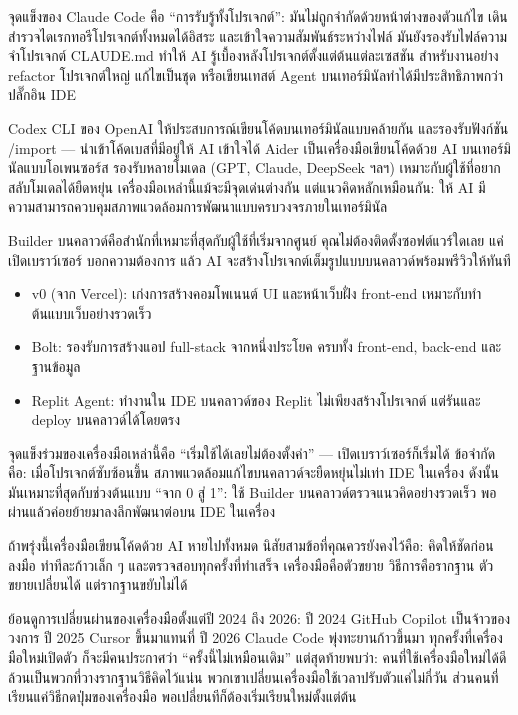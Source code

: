 จุดแข็งของ Claude Code คือ “การรับรู้ทั้งโปรเจกต์”: มันไม่ถูกจำกัดด้วยหน้าต่างของตัวแก้ไข เดินสำรวจไดเรกทอรีโปรเจกต์ทั้งหมดได้อิสระ และเข้าใจความสัมพันธ์ระหว่างไฟล์ มันยังรองรับไฟล์ความจำโปรเจกต์ CLAUDE.md ทำให้ AI รู้เบื้องหลังโปรเจกต์ตั้งแต่ต้นแต่ละเซสชัน สำหรับงานอย่าง refactor โปรเจกต์ใหญ่ แก้ไขเป็นชุด หรือเขียนเทสต์ Agent บนเทอร์มินัลทำได้มีประสิทธิภาพกว่าปลั๊กอิน IDE


Codex CLI ของ OpenAI ให้ประสบการณ์เขียนโค้ดบนเทอร์มินัลแบบคล้ายกัน และรองรับฟังก์ชัน /import — นำเข้าโค้ดเบสที่มีอยู่ให้ AI เข้าใจได้ Aider เป็นเครื่องมือเขียนโค้ดด้วย AI บนเทอร์มินัลแบบโอเพนซอร์ส รองรับหลายโมเดล (GPT, Claude, DeepSeek ฯลฯ) เหมาะกับผู้ใช้ที่อยากสลับโมเดลได้ยืดหยุ่น เครื่องมือเหล่านี้แม้จะมีจุดเด่นต่างกัน แต่แนวคิดหลักเหมือนกัน: ให้ AI มีความสามารถควบคุมสภาพแวดล้อมการพัฒนาแบบครบวงจรภายในเทอร์มินัล


Builder บนคลาวด์คือสำนักที่เหมาะที่สุดกับผู้ใช้ที่เริ่มจากศูนย์ คุณไม่ต้องติดตั้งซอฟต์แวร์ใดเลย แค่เปิดเบราว์เซอร์ บอกความต้องการ แล้ว AI จะสร้างโปรเจกต์เต็มรูปแบบบนคลาวด์พร้อมพรีวิวให้ทันที

\begin{itemize}
  \item v0 (จาก Vercel): เก่งการสร้างคอมโพเนนต์ UI และหน้าเว็บฝั่ง front-end เหมาะกับทำต้นแบบเว็บอย่างรวดเร็ว
  \item Bolt: รองรับการสร้างแอป full-stack จากหนึ่งประโยค ครบทั้ง front-end, back-end และฐานข้อมูล
  \item Replit Agent: ทำงานใน IDE บนคลาวด์ของ Replit ไม่เพียงสร้างโปรเจกต์ แต่รันและ deploy บนคลาวด์ได้โดยตรง
\end{itemize}

จุดแข็งร่วมของเครื่องมือเหล่านี้คือ “เริ่มใช้ได้เลยไม่ต้องตั้งค่า” — เปิดเบราว์เซอร์ก็เริ่มได้ ข้อจำกัดคือ: เมื่อโปรเจกต์ซับซ้อนขึ้น สภาพแวดล้อมแก้ไขบนคลาวด์จะยืดหยุ่นไม่เท่า IDE ในเครื่อง ดังนั้นมันเหมาะที่สุดกับช่วงต้นแบบ “จาก 0 สู่ 1”: ใช้ Builder บนคลาวด์ตรวจแนวคิดอย่างรวดเร็ว พอผ่านแล้วค่อยย้ายมาลงลึกพัฒนาต่อบน IDE ในเครื่อง


ถ้าพรุ่งนี้เครื่องมือเขียนโค้ดด้วย AI หายไปทั้งหมด นิสัยสามข้อที่คุณควรยังคงไว้คือ: คิดให้ชัดก่อนลงมือ ทำทีละก้าวเล็ก ๆ และตรวจสอบทุกครั้งที่ทำเสร็จ เครื่องมือคือตัวขยาย วิธีการคือรากฐาน ตัวขยายเปลี่ยนได้ แต่รากฐานขยับไม่ได้

ย้อนดูการเปลี่ยนผ่านของเครื่องมือตั้งแต่ปี 2024 ถึง 2026: ปี 2024 GitHub Copilot เป็นจ้าวของวงการ ปี 2025 Cursor ขึ้นมาแทนที่ ปี 2026 Claude Code พุ่งทะยานก้าวขึ้นมา ทุกครั้งที่เครื่องมือใหม่เปิดตัว ก็จะมีคนประกาศว่า “ครั้งนี้ไม่เหมือนเดิม” แต่สุดท้ายพบว่า: คนที่ใช้เครื่องมือใหม่ได้ดี ล้วนเป็นพวกที่วางรากฐานวิธีคิดไว้แน่น พวกเขาเปลี่ยนเครื่องมือใช้เวลาปรับตัวแค่ไม่กี่วัน ส่วนคนที่เรียนแค่วิธีกดปุ่มของเครื่องมือ พอเปลี่ยนทีก็ต้องเริ่มเรียนใหม่ตั้งแต่ต้น

